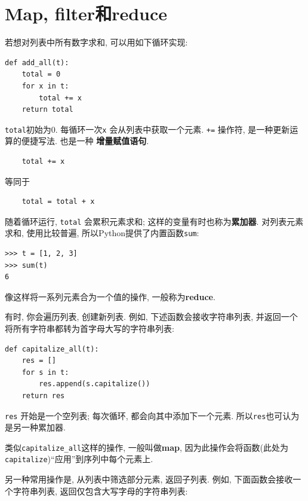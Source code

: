\documentclass[10pt]{book}
\begin{document}
\section{Map, filter和reduce}
\label{filter}

若想对列表中所有数字求和, 可以用如下循环实现:


\begin{verbatim}
def add_all(t):
    total = 0
    for x in t:
        total += x
    return total
\end{verbatim}
%
{\tt total}初始为0.
每循环一次{\tt x} 会从列表中获取一个元素. {\tt +=} 操作符, 是一种更新运算的便捷写法. 
也是一种 {\bf 增量赋值语句}. 

\begin{verbatim}
    total += x
\end{verbatim}
%
等同于

\begin{verbatim}
    total = total + x
\end{verbatim}
%
随着循环运行, {\tt total} 会累积元素求和;
这样的变量有时也称为{\bf 累加器}. 
对列表元素求和, 使用比较普遍, 所以Python提供了内置函数{\tt sum}:

\begin{verbatim}
>>> t = [1, 2, 3]
>>> sum(t)
6
\end{verbatim}
%
像这样将一系列元素合为一个值的操作, 一般称为{\bf reduce}.

有时, 你会遍历列表, 创建新列表. 例如, 下述函数会接收字符串列表, 
并返回一个将所有字符串都转为首字母大写的字符串列表:

\begin{verbatim}
def capitalize_all(t):
    res = []
    for s in t:
        res.append(s.capitalize())
    return res
\end{verbatim}
%
{\tt res} 开始是一个空列表; 每次循环, 都会向其中添加下一个元素. 
所以{\tt res}也可认为是另一种累加器. 

类似\verb"capitalize_all"这样的操作, 一般叫做{\bf map}, 
因为此操作会将函数(此处为{\tt capitalize})``应用''到序列中每个元素上. 

另一种常用操作是, 从列表中筛选部分元素, 返回子列表. 例如, 
下面函数会接收一个字符串列表, 返回仅包含大写字母的字符串列表:
\end{document}
